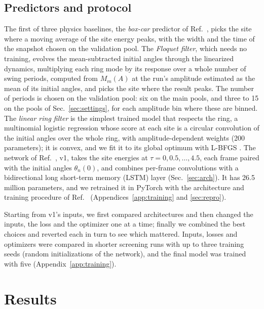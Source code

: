 \documentclass[11pt]{article}
\begin{document}
\subsection{Predictors and protocol}
\label{sec:predictors}

The first of three physics baselines, the \emph{box-car} predictor of Ref.~\cite{mittal2026jand}, picks the site where a moving average of the site energy peaks, with the width and the time of the snapshot chosen on the validation pool. The \emph{Floquet filter}, which needs no training, evolves the mean-subtracted initial angles through the linearized dynamics, multiplying each ring mode by its response over a whole number of swing periods, computed from $M_m(A)$ at the run's amplitude estimated as the mean of its initial angles, and picks the site where the result peaks. The number of periods is chosen on the validation pool: six on the main pools, and three to 15 on the pools of Sec.~\ref{sec:settings}, for each amplitude bin where these are binned. The \emph{linear ring filter} is the simplest trained model that respects the ring, a multinomial logistic regression whose score at each site is a circular convolution of the initial angles over the whole ring, with amplitude-dependent weights (200 parameters); it is convex, and we fit it to its global optimum with L-BFGS \cite{liu1989limited}. The network of Ref.~\cite{mittal2026jand}, v1, takes the site energies at $\tau=0,0.5,\dots,4.5$, each frame paired with the initial angles $\theta_n(0)$, and combines per-frame convolutions with a bidirectional long short-term memory (LSTM) layer (Sec.~\ref{sec:arch}). It has 26.5 million parameters, and we retrained it in PyTorch \cite{paszke2019pytorch} with the architecture and training procedure of Ref.~\cite{mittal2026jand} (Appendices~\ref{app:training} and \ref{sec:repro}).

Starting from v1's inputs, we first compared architectures and then changed the inputs, the loss and the optimizer one at a time; finally we combined the best choices and reverted each in turn to see which mattered. Inputs, losses and optimizers were compared in shorter screening runs with up to three training seeds (random initializations of the network), and the final model was trained with five (Appendix~\ref{app:training}).

\section{Results}
\label{sec:results}
\end{document}
